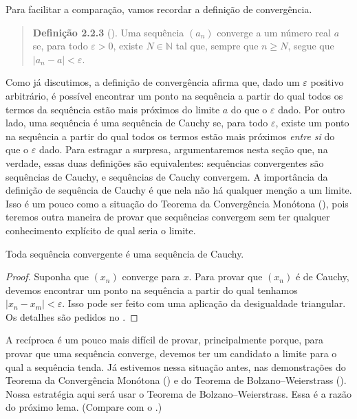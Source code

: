 Para facilitar a comparação, vamos recordar a definição de convergência.

\begin{quote}
\textbf{Definição 2.2.3} (). Uma sequência $(a_n)$ converge a um número real $a$ se, para todo $\varepsilon > 0$, existe $N \in \mathbb{N}$ tal que, sempre que $n \geq N$, segue que $|a_n - a| < \varepsilon$.
\end{quote}

Como já discutimos, a definição de convergência afirma que, dado um $\varepsilon$ positivo arbitrário, é possível encontrar um ponto na sequência a partir do qual todos os termos da sequência estão mais próximos do limite $a$ do que o $\varepsilon$ dado. Por outro lado, uma sequência é uma sequência de Cauchy se, para todo $\varepsilon$, existe um ponto na sequência a partir do qual todos os termos estão mais próximos \textit{entre si} do que o $\varepsilon$ dado. Para estragar a surpresa, argumentaremos nesta seção que, na verdade, essas duas definições são equivalentes: sequências convergentes são sequências de Cauchy, e sequências de Cauchy convergem. A importância da definição de sequência de Cauchy é que nela não há qualquer menção a um limite. Isso é um pouco como a situação do Teorema da Convergência Monótona (), pois teremos outra maneira de provar que sequências convergem sem ter qualquer conhecimento explícito de qual seria o limite.

\begin{theorem}\label{thm:convergente-cauchy}
Toda sequência convergente é uma sequência de Cauchy.
\end{theorem}

\begin{proof}
Suponha que $(x_n)$ converge para $x$. Para provar que $(x_n)$ é de Cauchy, devemos encontrar um ponto na sequência a partir do qual tenhamos $|x_n - x_m| < \varepsilon$. Isso pode ser feito com uma aplicação da desigualdade triangular. Os detalhes são pedidos no .
\end{proof}

A recíproca é um pouco mais difícil de provar, principalmente porque, para provar que uma sequência converge, devemos ter um candidato a limite para o qual a sequência tenda. Já estivemos nessa situação antes, nas demonstrações do Teorema da Convergência Monótona () e do Teorema de Bolzano--Weierstrass (). Nossa estratégia aqui será usar o Teorema de Bolzano--Weierstrass. Essa é a razão do próximo lema. (Compare com o .)

